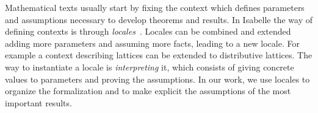 

Mathematical texts usually start by fixing the context which defines
parameters and assumptions necessary to develop theorems
and results. In Isabelle the way of defining contexts is through
\emph{locales}~\cite{ballarin2010tutorial}.
Locales can be combined and extended adding more parameters and assuming
more facts, leading to a new locale. For example a context describing
lattices can be extended to distributive lattices.
The way to instantiate a locale is \emph{interpreting} it, which consists
of giving concrete values to parameters and proving the assumptions.
In our work, we use locales to organize the formalization and to make
explicit the assumptions of the most important results.



